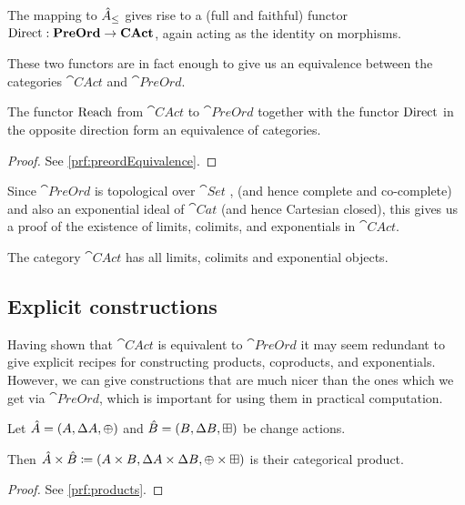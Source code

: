 The mapping to $\hat{A}_\leq$ gives rise to a (full and faithful) functor
$\operatorname{Direct} : \mathbf{PreOrd} \rightarrow \mathbf{CAct}$, again acting as the identity on morphisms.

These two functors are in fact enough to give us an equivalence between the categories
$\cat{CAct}$ and $\cat{PreOrd}$.

\begin{thm}[name=Equivalence of $\cat{CAct}$ and $\cat{PreOrd}$, restate=preordEquivalence]
  \label{thm:preordEquivalence}
  The functor $\operatorname{Reach}$ from $\cat{CAct}$ to $\cat{PreOrd}$ together with the
  functor $\operatorname{Direct}$ in the opposite direction form an equivalence of categories.
\end{thm}
\ifproofs
\begin{proof}
  See \cref{prf:preordEquivalence}.
\end{proof}
\fi

Since $\cat{PreOrd}$ is topological over $\cat{Set}$ \autocite[][Chapter V]{adamek2004abstract}, 
(and hence complete and co-complete) and also an exponential ideal of $\cat{Cat}$
(and hence Cartesian closed), this gives us a proof of the existence of limits, colimits, and exponentials in $\cat{CAct}$.

\begin{corollary}
  The category $\cat{CAct}$ has all limits, colimits and exponential objects.
\end{corollary}

\subsection{Explicit constructions}

Having shown that $\cat{CAct}$ is equivalent to $\cat{PreOrd}$ it may seem
redundant to give explicit recipes for constructing products, coproducts, and exponentials.
However, we can give constructions that are much nicer than the ones
which we get via $\cat{PreOrd}$, which is important for using them in
practical computation.

\begin{prop}[name=Products, restate=products]
  \label{prop:products}
  Let $\hat{A} = (A,\Delta A,\oplus)$ and $\hat{B} =
  (B,\Delta B,\boxplus)$ be change actions.

  Then $\hat{A} \times \hat{B} \coloneqq (A \times B,\Delta A \times
  \Delta B,\oplus \times \boxplus)$ is their categorical product.
\end{prop}
\ifproofs
\begin{proof}
  See \cref{prf:products}.
\end{proof}
\fi

